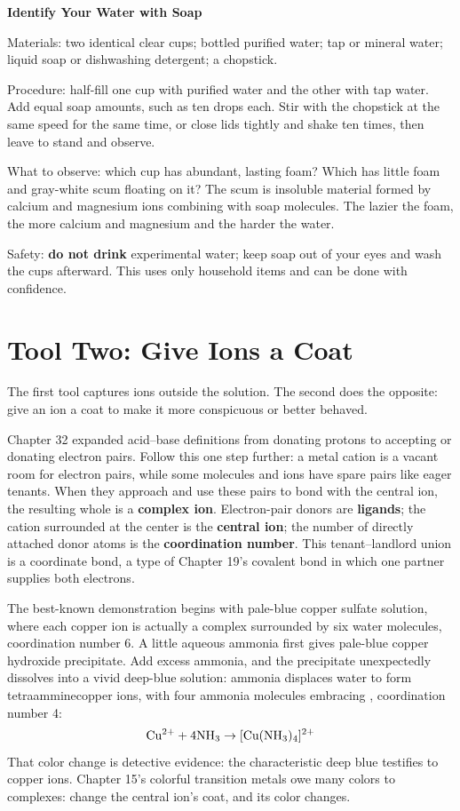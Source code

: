 \begin{shiyan}
\textbf{Identify Your Water with Soap}

Materials: two identical clear cups; bottled purified water; tap or mineral water; liquid soap or dishwashing detergent; a chopstick.

Procedure: half-fill one cup with purified water and the other with tap water. Add equal soap amounts, such as ten drops each. Stir with the chopstick at the same speed for the same time, or close lids tightly and shake ten times, then leave to stand and observe.

What to observe: which cup has abundant, lasting foam? Which has little foam and gray-white scum floating on it? The scum is insoluble material formed by calcium and magnesium ions combining with soap molecules. The lazier the foam, the more calcium and magnesium and the harder the water.

Safety: \textbf{do not drink} experimental water; keep soap out of your eyes and wash the cups afterward. This uses only household items and can be done with confidence.
\end{shiyan}

\section{Tool Two: Give Ions a Coat}

The first tool captures ions outside the solution. The second does the opposite: give an ion a coat to make it more conspicuous or better behaved.

Chapter 32 expanded acid--base definitions from donating protons to accepting or donating electron pairs. Follow this one step further: a metal cation is a vacant room for electron pairs, while some molecules and ions have spare pairs like eager tenants. When they approach and use these pairs to bond with the central ion, the resulting whole is a \textbf{complex ion}. Electron-pair donors are \textbf{ligands}; the cation surrounded at the center is the \textbf{central ion}; the number of directly attached donor atoms is the \textbf{coordination number}. This tenant--landlord union is a coordinate bond, a type of Chapter 19's covalent bond in which one partner supplies both electrons.

The best-known demonstration begins with pale-blue copper sulfate solution, where each copper ion is actually a complex surrounded by six water molecules, coordination number 6. A little aqueous ammonia first gives pale-blue copper hydroxide precipitate. Add excess ammonia, and the precipitate unexpectedly dissolves into a vivid deep-blue solution: ammonia displaces water to form tetraamminecopper ions, with four ammonia molecules embracing , coordination number 4:
\[\mathrm{Cu^{2+}} + 4\mathrm{NH_3} \rightarrow [\mathrm{Cu(NH_3)_4}]^{2+}\]
That color change is detective evidence: the characteristic deep blue testifies to copper ions. Chapter 15's colorful transition metals owe many colors to complexes: change the central ion's coat, and its color changes.

